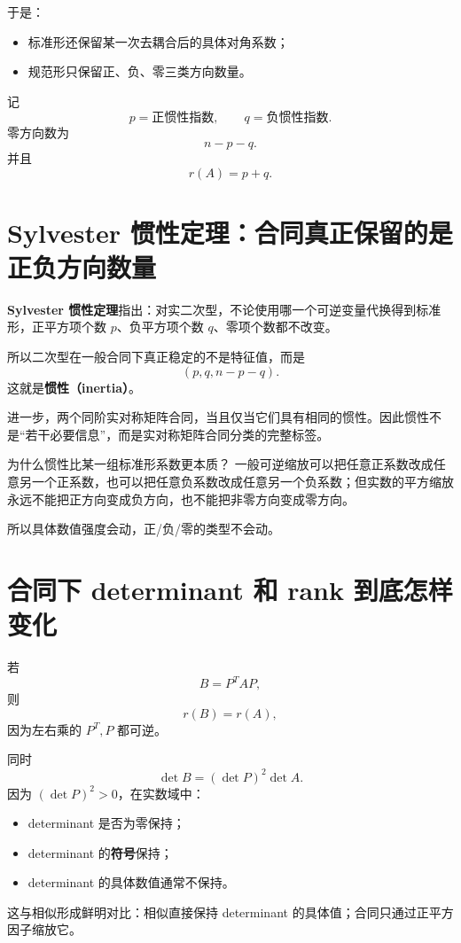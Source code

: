 \documentclass[11pt,a4paper]{ctexart}
\newcommand{\kw}[1]{\textbf{\color{deep}#1}}
\begin{document}
于是：
\begin{itemize}
  \item 标准形还保留某一次去耦合后的具体对角系数；
  \item 规范形只保留正、负、零三类方向数量。
\end{itemize}

记
\[
p=\text{正惯性指数},
\qquad
q=\text{负惯性指数}.
\]
零方向数为
\[
n-p-q.
\]
并且
\[
\boxed{r(A)=p+q.}
\]

\section{Sylvester 惯性定理：合同真正保留的是正负方向数量}

\kw{Sylvester 惯性定理}指出：对实二次型，不论使用哪一个可逆变量代换得到标准形，正平方项个数 $p$、负平方项个数 $q$、零项个数都不改变。

所以二次型在一般合同下真正稳定的不是特征值，而是
\[
\boxed{(p,q,n-p-q).}
\]
这就是\kw{惯性（inertia）}。

进一步，两个同阶实对称矩阵合同，当且仅当它们具有相同的惯性。因此惯性不是“若干必要信息”，而是实对称矩阵合同分类的完整标签。

\begin{methodbox}{为什么惯性比某一组标准形系数更本质？}
一般可逆缩放可以把任意正系数改成任意另一个正系数，也可以把任意负系数改成任意另一个负系数；但实数的平方缩放永远不能把正方向变成负方向，也不能把非零方向变成零方向。

所以具体数值强度会动，正/负/零的类型不会动。
\end{methodbox}

\section{合同下 determinant 和 rank 到底怎样变化}

若
\[
B=P^TAP,
\]
则
\[
r(B)=r(A),
\]
因为左右乘的 $P^T,P$ 都可逆。

同时
\[
\boxed{\det B=(\det P)^2\det A.}
\]
因为 $(\det P)^2>0$，在实数域中：
\begin{itemize}
  \item determinant 是否为零保持；
  \item determinant 的\kw{符号}保持；
  \item determinant 的具体数值通常不保持。
\end{itemize}

这与相似形成鲜明对比：相似直接保持 determinant 的具体值；合同只通过正平方因子缩放它。
\end{document}
